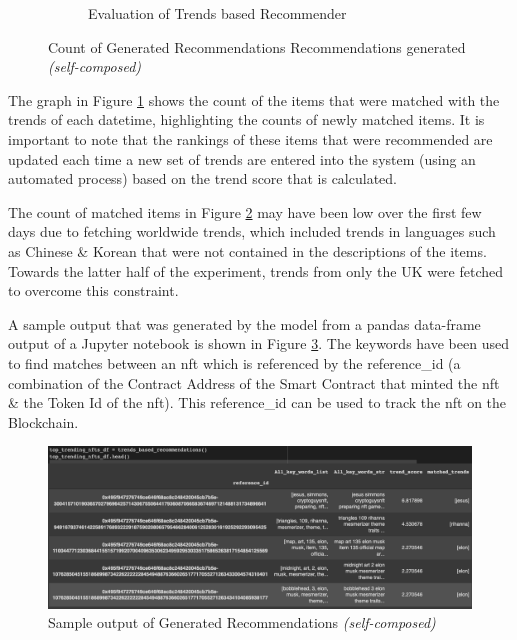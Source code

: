 \documentclass[manuscript,natbib=false, anonymous]{acmart}
\begin{document}
\begin{figure}[h]
\begin{subfigure}[b]{0.47\linewidth}
         \caption{Evaluation of Trends based Recommender}
         \label{fig:trends-recsys-new-matches}
     \end{subfigure}
     \hfill
        \caption{Count of Generated Recommendations Recommendations generated \textit{(self-composed)}}
        \label{fig:counts-of-matches}
\end{figure}

The graph in Figure \ref{fig:trends-recsys-new-matches} shows the count of the items that were matched with the trends of each datetime, highlighting the counts of newly matched items. It is important to note that the rankings of these items that were recommended are updated each time a new set of trends are entered into the system (using an automated process) based on the trend score that is calculated.

The count of matched items in Figure \ref{fig:counts-of-matches} may have been low over the first few days due to fetching worldwide trends, which included trends in languages such as Chinese \& Korean that were not contained in the descriptions of the items. Towards the latter half of the experiment, trends from only the UK were fetched to overcome this constraint.


A sample output that was generated by the model from a pandas data-frame output of a Jupyter notebook is shown in Figure \ref{fig:trends-recsys-sample-output}. The keywords have been used to find matches between an \gls{nft} which is referenced by the reference\_id (a combination of the Contract Address of the Smart Contract \cite{IntroductionSmartContracts} that minted the \gls{nft} \& the Token Id of the \gls{nft}). This reference\_id can be used to track the \gls{nft} on the Blockchain.
\begin{figure}[h]
\centering
\includegraphics[width=\linewidth]{images/trends_rec-output.png}
\caption{Sample output of Generated Recommendations \textit{(self-composed)}}
\label{fig:trends-recsys-sample-output}
\end{figure}
\end{document}

